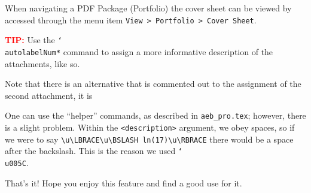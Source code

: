 \documentclass{article}
\newcommand{\cs}[1]{\texttt{\char`\\#1}}
\newcommand\newtopic{\par\ifdim\lastskip>0pt\relax\vskip-\lastskip\fi
\par\vskip6pt\noindent}
\def\aftersverbskip{\noindent}
\newenvironment{sverbatim}
{\par\small\verbatim}
{\endverbatim\par\aftergroup\aftersverbskip}
\begin{document}
When navigating a PDF Package (Portfolio) the cover sheet can be viewed by
accessed through the menu item \texttt{View > Portfolio > Cover Sheet}.

\newtopic\textbf{\textcolor{red}{TIP:}} Use the \cs{autolabelNum*}
command to assign a more informative description of the attachments,
like so.
\begin{sverbatim}
\end{sverbatim}

Note that there is an alternative that is commented out to the assignment of the
second attachment, it is
\begin{sverbatim}
\end{sverbatim}
One can use the ``helper'' commands, as described in \texttt{aeb\_pro.tex}; however,
there is a slight problem.  Within the \texttt{<description>} argument, we obey spaces, so
if we were to say \verb!\u\LBRACE\u\BSLASH ln(17)\u\RBRACE! there would be a space
after the backslash. This is the reason we used \cs{u005C}.

\newtopic That's it!  Hope you enjoy this feature and find a good
use for it.
\end{document}
